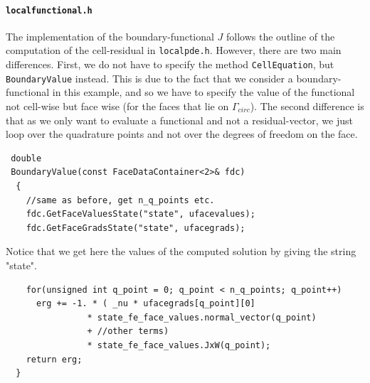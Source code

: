 \documentclass[prodmode,acmtoms]{acmsmall}
\numberwithin{equation}{section}
\begin{document}
\paragraph{\texttt{localfunctional.h}}
The implementation of the boundary-functional $J$ follows the outline of the computation of the cell-residual in \texttt{localpde.h}. However, there are two main differences. First, we do not have to specify the method \texttt{CellEquation}, but \texttt{BoundaryValue} instead. This is due to the fact that we consider a boundary-functional in this example, and so we have to specify the value of the functional not cell-wise but face wise (for the faces that lie on $\Gamma_{circ}$). The second difference is that as we only want to evaluate a functional and not a residual-vector, we just loop over the quadrature points and not over the degrees of freedom on the face.
\begin{lstlisting}
 double
 BoundaryValue(const FaceDataContainer<2>& fdc)
  {
    //same as before, get n_q_points etc.
    fdc.GetFaceValuesState("state", ufacevalues);
    fdc.GetFaceGradsState("state", ufacegrads);
\end{lstlisting}
Notice that we get here the values of the computed solution by giving the string "state".
\begin{lstlisting}
    for(unsigned int q_point = 0; q_point < n_q_points; q_point++)
      erg += -1. * ( _nu * ufacegrads[q_point][0]
                * state_fe_face_values.normal_vector(q_point)
                + //other terms)        
                * state_fe_face_values.JxW(q_point);
    return erg;
  }
\end{lstlisting}

% 
\end{document}
